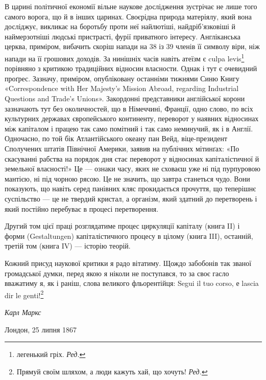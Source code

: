 В царині політичної економії вільне наукове дослідження
зустрічає не лише того самого ворога, що й в інших царинах.
Своєрідна природа матеріялу, який вона досліджує, викликає на
боротьбу проти неї найлютіші, найдріб’язковіші й наймерзотніші
людські пристрасті, фурії приватного інтересу. Англіканська
церква, приміром, вибачить скоріш напади на 38 із 39 членів
її символу віри, ніж напади на  її грошових доходів. За нинішніх
часів навіть атеїзм є culpa levis\footnote*{
легенький гріх. \emph{Ред.}
} порівняно з критикою
традиційних відносин власности. Однак і тут є очевидний проґрес.
Зазначу, приміром, опубліковану останніми тижнями Синю
Книгу «Correspondence with Her Majesty’s Mission Abroad, regarding
Industrial Questions and Trade’s Unions». Закордонні
представники англійської корони зазначають тут без околичностей,
що в Німеччині, Франції, одно слово, по всіх культурних
державах європейського континенту, переворот у наявних відносинах
між капіталом і працею так само помітний і так само неминучий,
як і в Англії. Одночасно, по той бік Атлантійського океану
пан Вейд, віце-президент Сполучених штатів Північної Америки,
заявив на публічних мітинґах: «По скасуванні рабства
на порядок дня стає переворот у відносинах капіталістичної й
земельної власності!» Це — ознаки часу, яких не сховаєш уже
ні під пурпуровою мантією, ні під чорною рясою. Це не значить,
що завтра станеться чудо. Вони показують, що навіть серед панівних
кляс прокидається прочуття, що теперішнє суспільство —
це не твердий кристал, а організм, який здатний до перетворень
і який постійно перебуває в процесі перетворення.

Другий том цієї праці розглядатиме процес циркуляції капіталу
(книга II) і форми (Gestaltungen) капіталістичного процесу
в цілому (книга III), останній, третій том (книга IV) — історію
теорій.

Кожний присуд наукової критики я радо вітатиму. Щождо
забобонів так званої громадської думки, перед якою я ніколи не
поступався, то за своє гасло вважатиму я, як і раніш, слова великого
фльорентійця: Segui il tuo corso, е lascia dir le genti!\footnote*{
Прямуй своїм шляхом, а люди кажуть хай, що хочуть! \emph{Ред.}
}

\begin{flushright}
  \emph{Карл Маркс}
\end{flushright}

{\small Лондон, 25 липня 1867~}
